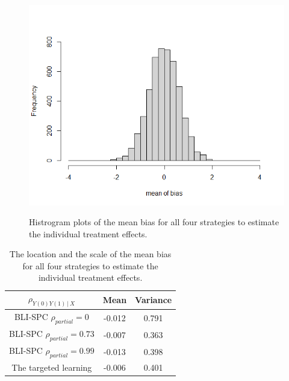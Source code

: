 \begin{figure}[ht!]
\begin{center}
{{					\label{boxplot:c}
					\includegraphics[scale=.5]{plots/plot4.3}
				}
			}
		\end{center}
		\caption{Histrogram plots of the mean bias for all four strategies to estimate the individual treatment effects.}
		\label{fig4_1}
	\end{figure}
	
	\begin{table}[ht!]
		\centering
		\begin{tabular}{c|cc}
			$\rho_{Y(0)Y(1)\,|\ X}$                       & Mean   & Variance \\
			\hline                              
			BLI-SPC $\rho_{partial} = 0$       & -0.012     & 0.791 \\
			BLI-SPC $\rho_{partial} = 0.73$    & -0.007     & 0.363 \\
			BLI-SPC $\rho_{partial} = 0.99$    & -0.013     & 0.398 \\
			The targeted learning         & -0.006 & 0.401 
		\end{tabular}
		\caption{The location and the scale of the mean bias for all four strategies to estimate the individual treatment effects.}
		\label{tab4_1}
	\end{table} 
	
